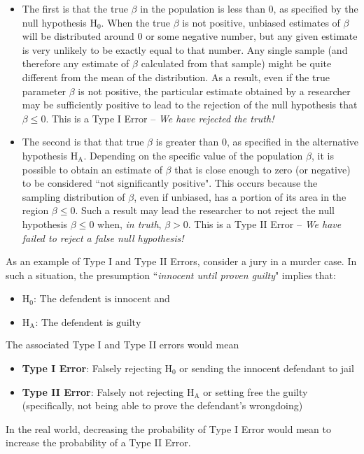 \documentclass[11pt]{article}
\begin{document}
\begin{itemize}
\item The first is that the true $\beta$ in the population is less than $0$, as specified by the null hypothesis H$_0$. When the true $\beta$ is not positive, unbiased estimates of $\beta$ will be distributed around $0$ or some negative number, but any given estimate is very unlikely to be exactly equal to that number. Any single sample (and therefore any estimate of $\beta$ calculated from that sample) might be quite different from the mean of the distribution. As a result, even if the true parameter $\beta$ is not positive, the particular estimate obtained by a researcher may be sufficiently positive to lead to the rejection of the null hypothesis that $\beta \leq 0$. This is a Type I Error -- \textit{We have rejected the truth!}
\item The second is that that true $\beta$ is greater than $0$, as specified in the alternative hypothesis H$_\text{A}$. Depending on the specific value of the population $\beta$, it is possible to obtain an estimate of $\beta$ that is close enough to zero (or negative) to be considered ``not significantly positive". This occurs because the sampling distribution of $\beta$, even if unbiased, has a portion of its area in the region $\beta \leq 0$. Such a result may lead the researcher to not reject the null hypothesis $\beta \leq 0$ when, \textit{in truth}, $\beta > 0$. This is a Type II Error -- \textit{We have failed to reject a false null hypothesis!}
\end{itemize}
As an example of Type I and Type II Errors, consider a jury in a murder case. In such a situation, the presumption ``\textit{innocent until proven guilty}" implies that:
\begin{itemize}
\item $\text{H}_0\text{: The defendent is innocent}$ and \item $\text{H}_\text{A}\text{: The defendent is guilty}$
\end{itemize}
The associated Type I and Type II errors would mean 
\begin{itemize}
\item \textbf{Type I Error}: Falsely rejecting H$_0$ or sending the innocent defendant to jail
\item \textbf{Type II Error}: Falsely not rejecting H$_\text{A}$ or setting free the guilty (specifically, not being able to prove the defendant's wrongdoing)
\end{itemize}
In the real world, decreasing the probability of Type I Error would mean to increase the probability of a Type II Error. 
\end{document}
